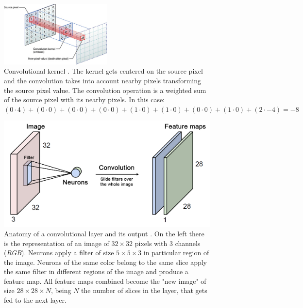 \begin{figure}[htb]
  \begin{center}
    \includegraphics[width=0.5\textwidth]{gfx/kernel}
  \end{center}
  \caption{Convolutional kernel \cite{Apple}. The kernel gets centered on the source pixel and the convolution takes into account nearby pixels transforming the source pixel value. The convolution operation is a weighted sum of the source pixel with its nearby pixels. In this case:\\
    $(0\cdot4)+(0\cdot0)+(0\cdot0)
     +(0\cdot0)+(1\cdot0)+(1\cdot0)
     +(0\cdot0)+(1\cdot0)+(2\cdot-4) = -8$
  }
  \label{fig:sec:theory:kernel}
\end{figure}

\begin{figure}[htb]
  \includegraphics[width=\textwidth]{gfx/conv-layer-2}
  \caption{Anatomy of a convolutional layer and its output \cite{Guerzhoy2016}. On the left there is the representation of an image of ${32}\times{32}$ pixels with $3$ channels (\emph{RGB}). Neurons apply a filter of size ${5}\times{5}\times{3}$ in particular region of the image. Neurons of the same color belong to the same slice apply the same filter in different regions of the image and produce a feature map. All feature maps combined become the "new image" of size ${28}\times{28}\times{N}$, being $N$ the number of slices in the layer, that gets fed to the next layer.}
  \label{fig:sec:theory:conv-layer-2}
\end{figure}

